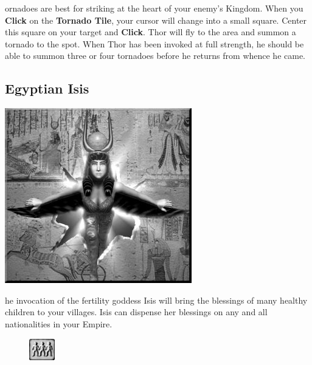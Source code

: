 ornadoes are best for striking at the heart of your enemy’s Kingdom. When you \textbf{Click} on the \textbf{Tornado Tile}, your cursor will change into a small square. Center this square on your target and \textbf{Click}. Thor will fly to the area and summon a tornado to the spot. When Thor has been invoked at full strength, he should be able to summon three or four tornadoes before he returns from whence he came.

\clearpage

\subsection{Egyptian Isis}


\begin{center}
	\includegraphics[width=.9\linewidth]{Aisis}
\end{center}

he invocation of the fertility goddess Isis will bring the blessings of many healthy children to your villages. Isis can dispense her blessings on any and all nationalities in your Empire.

\begin{figure}
	\vspace{-20pt}
	\begin{center}
		\includegraphics[width=0.1\textwidth]{Tfertility}
	\end{center}
	\vspace{-20pt}
\end{figure}

